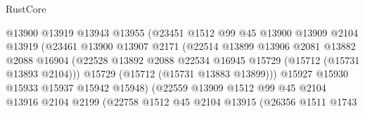 \begin{lexlean}{RustCore}
\begin{coremodule}
                                    @13900
                                    @13919
                                    @13943
                                    @13955
                                    (@23451
                                      @1512
                                      @99
                                      @45
                                      @13900
                                      @13909
                                      @2104
                                      @13919
                                      (@23461
                                        @13900
                                        @13907
                                        @2171
                                        (@22514
                                          @13899
                                          @13906
                                          @2081
                                          @13882
                                          @2088
                                          @16904
                                          (@22528
                                            @13892
                                            @2088
                                            @22534
                                            @16945
                                            @15729
                                            (@15712 (@15731 @13893 @2104)))
                                          @15729
                                          (@15712 (@15731 @13883 @13899)))
                                        @15927
                                        @15930
                                        @15933
                                        @15937
                                        @15942
                                        @15948)
                                      (@22559
                                        @13909
                                        @1512
                                        @99
                                        @45
                                        @2104
                                        @13916
                                        @2104
                                        @2199
                                        (@22758
                                          @1512
                                          @45
                                          @2104
                                          @13915
                                          (@26356
                                            @1511
                                            @1743

\end{coremodule}
\end{lexlean}
